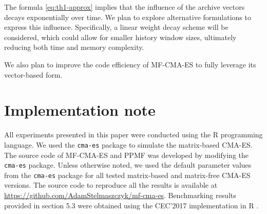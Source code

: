 \documentclass[dvipsnames,format=sigconf,anonymous=false,review=false]{acmart}
\begin{document}
The formula \eqref{eq:th1-approx} implies that the influence of the archive vectors decays exponentially over time. We plan to explore alternative formulations to express this influence. Specifically, a linear weight decay scheme will be considered, which could allow for smaller history window sizes, ultimately reducing both time and memory complexity.

We also plan to improve the code efficiency of MF-CMA-ES to fully leverage its vector-based form. 

\section*{Implementation note}

All experiments presented in this paper were conducted using the R programming language. 
We used the {\tt cma-es} package \cite{cmaes-package} to simulate the matrix-based CMA-ES. The source code of MF-CMA-ES and PPMF was developed by modifying the {\tt cma-es} package. Unless otherwise noted, we used the default parameter values from the {\tt cma-es} package for all tested matrix-based and matrix-free CMA-ES versions. The source code to reproduce all the results is available at \href{https://github.com/AdamStelmaszczyk/mf-cma-es}{https://github.com/AdamStelmaszczyk/mf-cma-es}. Benchmarking results provided in section 5.3 were obtained using the CEC'2017 implementation in R \cite{cecs-package}.

\clearpage


\end{document}
